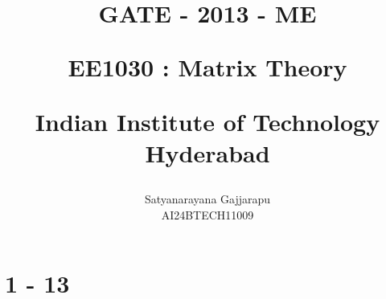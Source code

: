 \documentclass[journal]{IEEEtran}
\begin{document}

\vspace{3cm}




\title{
GATE - 2013 - ME

\large{EE1030 : Matrix Theory}

Indian Institute of Technology Hyderabad
}
\author{Satyanarayana Gajjarapu

AI24BTECH11009
}	





\maketitle




\bigskip

\renewcommand{\thefigure}{\theenumi}
\renewcommand{\thetable}{\theenumi}


\section{1 - 13}
\end{document}
